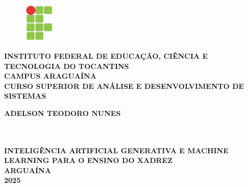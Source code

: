 \thispagestyle{empty}

\vfill
 \begin{center}
    \begin{figure}[t]
     \centering
            \includegraphics[width=1.5cm]{imagens/logo-ifto.jpg}\\[-0.1in]
     \end{figure}

    {\normalsize\bfseries INSTITUTO FEDERAL DE EDUCAÇÃO, CIÊNCIA E TECNOLOGIA DO TOCANTINS} \\
    {\normalsize\bfseries CAMPUS ARAGUAÍNA}  \\
    {\normalsize\bfseries CURSO SUPERIOR DE ANÁLISE E DESENVOLVIMENTO DE SISTEMAS}  \\ 
    
    \vspace*{1cm}
    \begin{normalsize} \bfseries   ADELSON TEODORO NUNES
    \end{normalsize}\\[0.4in]

    \vspace*{4cm}
    \noindent \\
    \normalsize\bfseries{INTELIGÊNCIA ARTIFICIAL GENERATIVA E MACHINE LEARNING PARA O ENSINO DO XADREZ} \\
    \vfill
    \normalsize\bfseries{ARGUAÍNA \\ 2025}
\end{center}


\normalsize